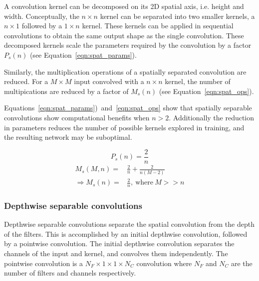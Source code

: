 \documentclass{article}
\begin{document}
	A convolution kernel can be decomposed on its 2D spatial axis, i.e. height and width. Conceptually, the $n \times n$ kernel can be separated into two smaller kernels, a $n \times 1$ followed by a $1 \times n$ kernel. These kernels can be applied in sequential convolutions to obtain the same output shape as the single convolution. These decomposed kernels scale the parameters required by the convolution by a factor $P_s(n)$ (see Equation~\ref{eqn:spat_params}). 
	
	Similarly, the multiplication operations of a spatially separated convolution are reduced. For a $M \times M$ input convolved with a $n \times n$ kernel, the number of multipications are reduced by a factor of $M_s(n)$ (see Equation~\ref{eqn:spat_ops}). 
	
	Equations~\ref{eqn:spat_params})~and~\ref{eqn:spat_ops} show that spatially separable convolutions show computational benefits when $n > 2$. Additionally the reduction in parameters reduces the number of possible kernels explored in training, and the resulting network may be suboptimal.
	
	\begin{multicols}{2}
		\begin{equation}\label{eqn:spat_params}
			P_s(n) = \frac{2}{n}
		\end{equation}
	\break
		\begin{equation}\label{eqn:spat_ops}
			\begin{split}
				M_s(M, n) = & \frac{2}{n} + \frac{2}{n(M-2)} \\
				\Rightarrow M_s(n) = & \frac{2}{n},~\text{where}~M >> n
			\end{split}
		\end{equation}		
	\end{multicols}
	
	\subsubsection{Depthwise separable convolutions}	
	
	Depthwise separable convolutions separate the spatial convolution from the depth of the filters. This is accomplished by an initial depthwise convolution, followed by a pointwise convolution. The initial depthwise convolution separates the channels of the input and kernel, and convolves them independently. The pointwise convolution is a $N_F \times 1 \times 1 \times N_C$ convolution where $N_F$ and $N_C$ are the number of filters and channels respectively. 
	
\end{document}
